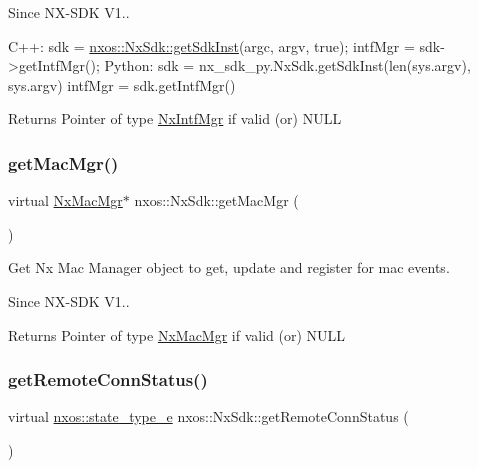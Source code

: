 \begin{DoxySince}{Since}
N\+X-\/\+S\+DK V1..
\end{DoxySince}

\begin{DoxyCode}
C++:
       sdk = \mbox{\hyperlink{classnxos_1_1_nx_sdk_a5050e2d26c40744b4fc7862068a83f39}{nxos::NxSdk::getSdkInst}}(argc, argv, \textcolor{keyword}{true});
       intfMgr = sdk->getIntfMgr();
Python:
       sdk = nx\_sdk\_py.NxSdk.getSdkInst(len(sys.argv), sys.argv)
       intfMgr = sdk.getIntfMgr()
\end{DoxyCode}


\begin{DoxyReturn}{Returns}
Pointer of type \mbox{\hyperlink{classnxos_1_1_nx_intf_mgr}{Nx\+Intf\+Mgr}} if valid (or) N\+U\+LL 
\end{DoxyReturn}
\mbox{\label{classnxos_1_1_nx_sdk_adfa969f547080efd92f90f55ebc930c5}} 
\subsubsection{\texorpdfstring{get\+Mac\+Mgr()}{getMacMgr()}}
{\footnotesize\ttfamily virtual \mbox{\hyperlink{classnxos_1_1_nx_mac_mgr}{Nx\+Mac\+Mgr}}$\ast$ nxos\+::\+Nx\+Sdk\+::get\+Mac\+Mgr (\begin{DoxyParamCaption}{ }\end{DoxyParamCaption})\hspace{0.3cm}{\ttfamily [pure virtual]}}

Get Nx Mac Manager object to get, update and register for mac events.

\begin{DoxySince}{Since}
N\+X-\/\+S\+DK V1..
\end{DoxySince}
\begin{DoxyReturn}{Returns}
Pointer of type \mbox{\hyperlink{classnxos_1_1_nx_mac_mgr}{Nx\+Mac\+Mgr}} if valid (or) N\+U\+LL 
\end{DoxyReturn}
\mbox{\label{classnxos_1_1_nx_sdk_a17102543d36406daaed8370802eecca3}} 
\subsubsection{\texorpdfstring{get\+Remote\+Conn\+Status()}{getRemoteConnStatus()}}
{\footnotesize\ttfamily virtual \mbox{\hyperlink{nx__common_8h_a7c257059d03188765435b36e95dbb764}{nxos\+::state\+\_\+type\+\_\+e}} nxos\+::\+Nx\+Sdk\+::get\+Remote\+Conn\+Status (\begin{DoxyParamCaption}{ }\end{DoxyParamCaption})\hspace{0.3cm}{\ttfamily [pure virtual]}}

